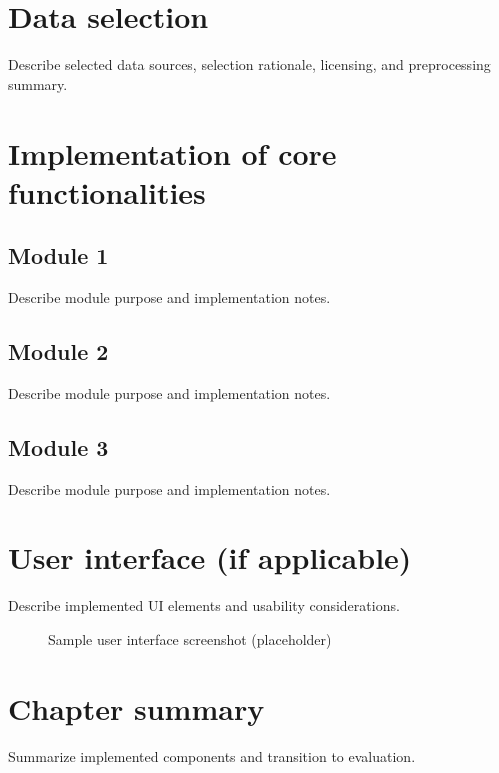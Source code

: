 \section{Data selection}
Describe selected data sources, selection rationale, licensing, and preprocessing summary.

\section{Implementation of core functionalities}
\subsection{Module 1}
Describe module purpose and implementation notes.

\subsection{Module 2}
Describe module purpose and implementation notes.

\subsection{Module 3}
Describe module purpose and implementation notes.

\section{User interface (if applicable)}
Describe implemented UI elements and usability considerations.

\begin{figure}[H]
    \centering
    \fbox{\rule{0pt}{2in}\rule{0.9\linewidth}{0pt}}
    \caption{Sample user interface screenshot (placeholder)}
    \label{fig:ui-screenshot}
\end{figure}

\section{Chapter summary}
Summarize implemented components and transition to evaluation.
